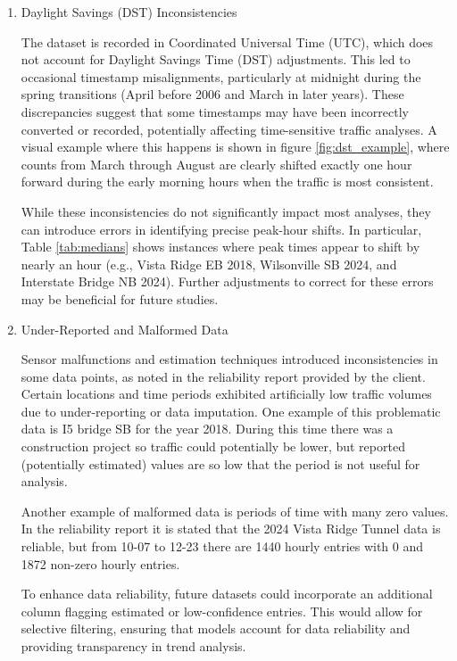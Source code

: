 \documentclass{article}
\begin{document}
\begin{enumerate}
    \item Daylight Savings (DST) Inconsistencies 

        The dataset is recorded in Coordinated Universal Time (UTC), which does not account for Daylight Savings Time (DST) adjustments. This led to occasional timestamp misalignments, particularly at midnight during the spring transitions (April before 2006 and March in later years). These discrepancies suggest that some timestamps may have been incorrectly converted or recorded, potentially affecting time-sensitive traffic analyses. A visual example where this happens is shown in figure \ref{fig:dst_example}, where counts from March through August are clearly shifted exactly one hour forward during the early morning hours when the traffic is most consistent. 

        While these inconsistencies do not significantly impact most analyses, they can introduce errors in identifying precise peak-hour shifts. In particular, Table \ref{tab:medians} shows instances where peak times appear to shift by nearly an hour (e.g., Vista Ridge EB 2018, Wilsonville SB 2024, and Interstate Bridge NB 2024). Further adjustments to correct for these errors may be beneficial for future studies.

    \item Under-Reported and Malformed Data

        Sensor malfunctions and estimation techniques introduced inconsistencies in some data points, as noted in the reliability report provided by the client. Certain locations and time periods exhibited artificially low traffic volumes due to under-reporting or data imputation. One example of this problematic data is I5 bridge SB for the year 2018. During this time there was a construction project so traffic could potentially be lower, but reported (potentially estimated) values are so low that the period is not useful for analysis.

        Another example of malformed data is periods of time with many zero values. In the reliability report it is stated that the 2024 Vista Ridge Tunnel data is reliable, but from 10-07 to 12-23 there are 1440 hourly entries with 0 and 1872 non-zero hourly entries.

        To enhance data reliability, future datasets could incorporate an additional column flagging estimated or low-confidence entries. This would allow for selective filtering, ensuring that models account for data reliability and providing transparency in trend analysis.
\end{enumerate}
\end{document}
